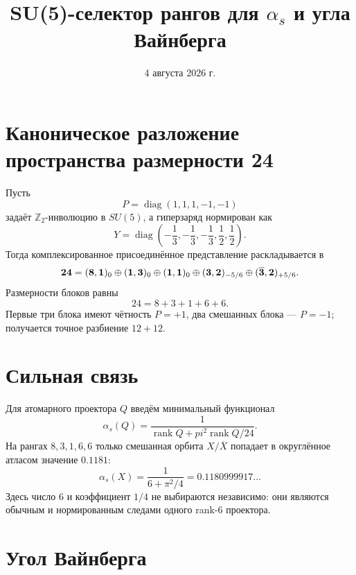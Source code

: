 \documentclass[12pt,a4paper]{article}
\title{SU(5)-селектор рангов для $\alpha_s$ и угла Вайнберга}
\author{}
\date{4 августа 2026 г.}
\begin{document}
\maketitle

\section{Каноническое разложение пространства размерности 24}

Пусть
\begin{equation}
 P=\operatorname{diag}(1,1,1,-1,-1)
\end{equation}
задаёт $\mathbb Z_2$-инволюцию в $SU(5)$, а гиперзаряд нормирован как
\begin{equation}
 Y=\operatorname{diag}\left(-\frac13,-\frac13,-\frac13,
 \frac12,\frac12\right).
\end{equation}
Тогда комплексированное присоединённое представление раскладывается в
\begin{equation}
 \mathbf{24}
 =({\bf8},{\bf1})_0
 \oplus({\bf1},{\bf3})_0
 \oplus({\bf1},{\bf1})_0
 \oplus({\bf3},{\bf2})_{-5/6}
 \oplus(\overline{\bf3},{\bf2})_{+5/6}.
\end{equation}
Размерности блоков равны
\begin{equation}
 24=8+3+1+6+6.
\end{equation}
Первые три блока имеют чётность $P=+1$, два смешанных блока --- $P=-1$;
получается точное разбиение $12+12$.

\section{Сильная связь}

Для атомарного проектора $Q$ введём минимальный функционал
\begin{equation}
 \alpha_s(Q)
 =\frac{1}{\operatorname{rank}Q+pi^2
 \operatorname{rank}Q/24}.
\end{equation}
На рангах $8,3,1,6,6$ только смешанная орбита $X/\overline X$ попадает в
округлённое атласом значение $0.1181$:
\begin{equation}
 \alpha_s(X)
 =\frac{1}{6+\pi^2/4}
 =0.1180999917\ldots
\end{equation}
Здесь число $6$ и коэффициент $1/4$ не выбираются независимо: они являются
обычным и нормированным следами одного rank-$6$ проектора.

\section{Угол Вайнберга}
\end{document}
